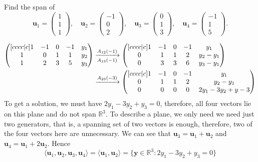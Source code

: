 \begin{example}
    Find the span of
    \[
        \bm u_1=
        \begin{pmatrix}
            1\\1\\1
        \end{pmatrix}
        ,\quad\bm u_2=
        \begin{pmatrix}
            -1\\0\\2
        \end{pmatrix}
        ,\quad\bm u_3=
        \begin{pmatrix}
            0\\1\\3
        \end{pmatrix}
        ,\quad\bm u_4=
        \begin{pmatrix}
            -1\\1\\5
        \end{pmatrix}
        .
    \]
    
    \begin{align*}
        \begin{pmatrix}[cccc|c]
            1 & -1 & 0 & -1 & y_1 \\
            1 & 0 & 1 & 1 & y_2 \\
            1 & 2 & 3 & 5 & y_3 \\
        \end{pmatrix}
        & \eroarrow{A_{12}(-1)}{A_{13}(-1)}
        \begin{pmatrix}[cccc|c]
            1 & -1 & 0 & -1 & y_1 \\
            0 & 1 & 1 & 2 & y_2 - y_1 \\
            0 & 3 & 3 & 6 & y_3 - y_1 \\
        \end{pmatrix}\\
        & \eroarrow{A_{23}(-3)}{}
        \begin{pmatrix}[cccc|c]
            1 & -1 & 0 & -1 & y_1 \\
            0 & 1 & 1 & 2 & y_2 - y_1 \\
            0 & 0 & 0 & 0 & 2y_1 - 3y_2 + y-3 \\
        \end{pmatrix}
    \end{align*}
    To get a solution, we must have $2y_1 - 3y_2 + y_3 = 0$, therefore, all four vectors lie on this plane and do not span $\mathbb R^3$. To describe a plane, we only need we need just two generators, that is, a spanning set of two vectors is enough, therefore, two of the four vectors here are unnecessary. We can see that $\bm u_3 = \bm u_1 + \bm u_2$ and $\bm u_4=\bm u_1 + 2\bm u_2$. Hence \[\langle \bm u_1, \bm u_2, \bm u_3, \bm u_4 \rangle = \langle \bm u_1, \bm u_2 \rangle=\{\bm y \in \mathbb R^3 : 2y_1 - 3y_2 + y_3 = 0\}\]
\end{example}

